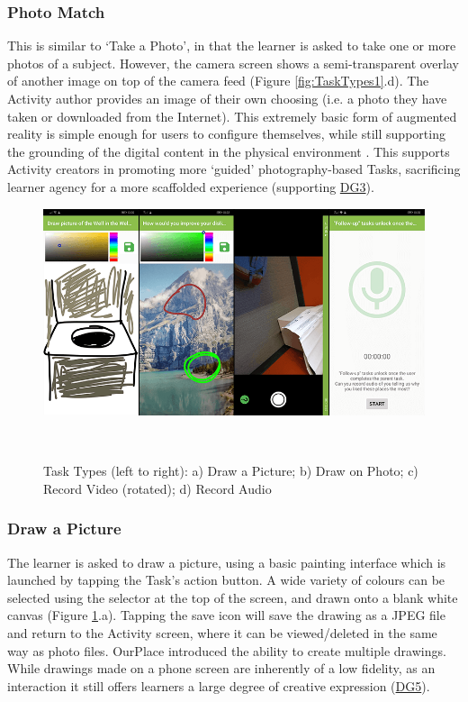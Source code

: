 \subsubsection*{Photo Match}
This is similar to `Take a Photo', in that the learner is asked to take one or more photos of a subject. However, the camera screen shows a semi-transparent overlay of another image on top of the camera feed (Figure \ref{fig:TaskTypes1}.d). The Activity author provides an image of their own choosing (i.e. a photo they have taken or downloaded from the Internet). This extremely basic form of augmented reality is simple enough for users to configure themselves, while still supporting the grounding of the digital content in the physical environment \citep{javornik2019}. This supports Activity creators in promoting more `guided' photography-based Tasks, sacrificing learner agency for a more scaffolded experience (supporting \hyperref[DG3]{DG3}).

\begin{figure}
  \centering
  \includegraphics[width=1\columnwidth]{images/chapter05/tasktypes2.png}
  \caption[Task Types (part 2)]{Task Types (left to right): a) Draw a Picture; b) Draw on Photo; c) Record Video (rotated); d) Record Audio}~\label{fig:TaskTypes2}
\end{figure}

\subsubsection*{Draw a Picture}
The learner is asked to draw a picture, using a basic painting interface which is launched by tapping the Task's action button. A wide variety of colours can be selected using the selector at the top of the screen, and drawn onto a blank white canvas (Figure \ref{fig:TaskTypes2}.a). Tapping the save icon will save the drawing as a JPEG file and return to the Activity screen, where it can be viewed/deleted in the same way as photo files. OurPlace introduced the ability to create multiple drawings. While drawings made on a phone screen are inherently of a low fidelity, as an interaction it still offers learners a large degree of creative expression (\hyperref[DG5]{DG5}).


